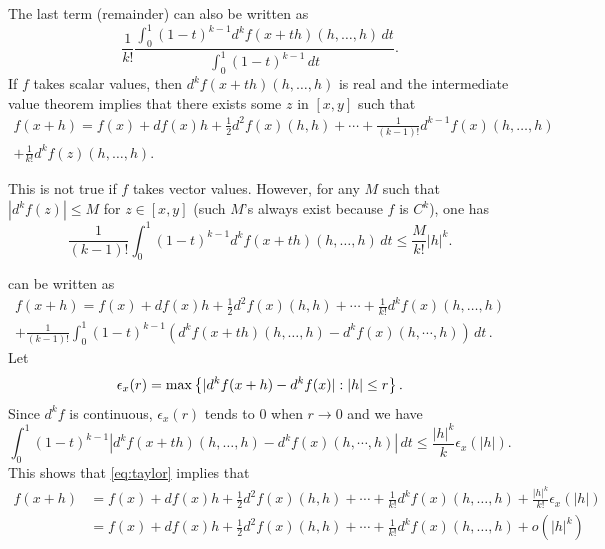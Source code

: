 \begin{enumerate}[label={\bf \arabic*.}]
The last term (remainder) can also be written as
\[
\frac1{k!} \frac{\int_0^1 (1-t)^{k-1}d^kf(x+th)(h, \ldots, h)\, dt}{\int_0^1 (1-t)^{k-1}\, dt}.
\]
If $f$ takes scalar values, then $d^kf(x+th)(h, \ldots, h)$ is real and the intermediate value theorem implies that there exists some $z$ in $[x,y]$ such that 
\begin{multline}
\label{eq:taylor.z}
f(x+h) = f(x) + df(x) h + \frac12 d^2 f(x)(h,h) + \cdots + \frac1{(k-1)!} d^{k-1}f(x)(h, \ldots, h) \\
+ \frac1{k!} d^kf(z)(h, \ldots, h).
\end{multline}

This is not true if $f$ takes vector values. However,  for any $M$ such that $|d^kf(z)| \leq M$ for $z \in [x,y]$  (such $M$'s always exist because $f$ is $C^k$), one has 
\[
\frac1{(k-1)!} \int_0^1 (1-t)^{k-1}d^kf(x+th)(h, \ldots, h)\, dt \leq \frac{M}{k!} |h|^k.
\]

 can be written as
\begin{multline}
f(x+h) = f(x) + df(x) h + \frac12 d^2 f(x)(h,h) + \cdots + \frac1{k!} d^{k}f(x)(h, \ldots, h) \\
+ \frac1{(k-1)!} \int_0^1 (1-t)^{k-1}(d^kf(x+th)(h, \ldots, h)-d^k f(x)(h,\cdots, h))\, dt\,.
\label{eq:taylor.diff}
\end{multline}
Let 
\[
\epsilon_x(r) = \max\left\{ |d^kf(x+h) - d^kf(x)|:|h| \leq r \right\}.
\]
 Since $d^k f$ is continuous, $\epsilon_x(r)$ tends to 0 when $r\to 0$ and we have
 \[
 \int_0^1 (1-t)^{k-1}|d^kf(x+th)(h, \ldots, h)-d^k f(x)(h,\cdots, h)|\, dt \leq \frac{|h|^k}{k}\epsilon_x(|h|).
 \]
This shows that \cref{eq:taylor} implies that 
\begin{align}
\label{eq:taylor.epsilon}
f(x+h) &= f(x) + df(x) h + \frac12 d^2 f(x)(h,h) + \cdots + \frac1{k!} d^{k}f(x)(h, \ldots, h) + \frac{|h|^k}{k!}\epsilon_x(|h|)&\\
&= f(x) + df(x) h + \frac12 d^2 f(x)(h,h) + \cdots + \frac1{k!} d^{k}f(x)(h, \ldots, h)+ o(|h|^k)&
\label{eq:taylor.o}
\end{align}
 

\end{enumerate}

